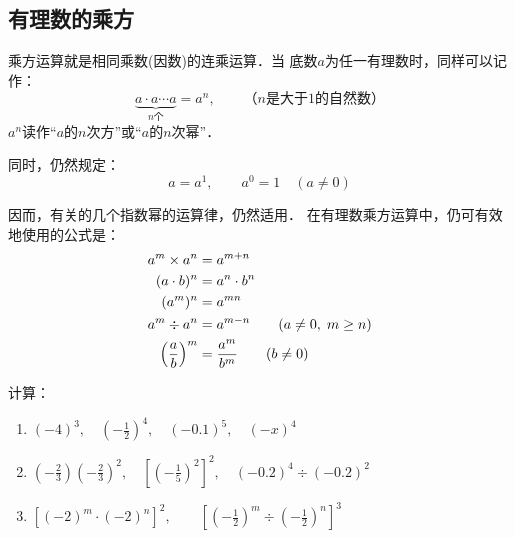 \subsection{有理数的乘方}
  乘方运算就是相同乘数(因数)的连乘运算．当
底数$a$为任一有理数时，同样可以记作：
\[\underbrace{a\cdot a\cdots a}_{n\text{个}} =a^n,\qquad \text{（$n$是大于1的自然数）}  \]
$a^n$读作“$a$的$n$次方”或“$a$的$n$次幂”．

同时，仍然规定：
\[a=a^1,\qquad a^0=1\quad (a\ne 0) \]

因而，有关的几个指数幂的运算律，仍然适用．
在有理数乘方运算中，仍可有效地使用的公式是：
\[\begin{split}
    a^m\times a^n &=a^{m+n}\\
    (a\cdot b)^n&=a^n\cdot b^n\\
    (a^m)^n&=a^{mn}\\
    a^m\div a^n&=a^{m-n}\qquad (a\ne 0,\; m\ge n)\\
\left(\dfrac{a}{b}\right)^m&=\dfrac{a^m}{b^m}\qquad (b\ne 0)
\end{split}\]



\begin{example}
    计算：
\begin{enumerate}
    \item $(-4)^3,\quad \left(-\frac{1}{2}\right)^4,\quad (-0.1)^5,\quad (-x)^4$
    \item $\left(-\frac{2}{3}\right)\left(-\frac{2}{3}\right)^2,\quad \left[\left(-\frac{1}{5}\right)^2\right]^2,\quad (-0.2)^4\div (-0.2)^2$
    \item $\left[(-2)^m\cdot (-2)^n\right]^2,\qquad \left[\left(-\frac{1}{2}\right)^m\div \left(-\frac{1}{2}\right)^n\right]^3$
\end{enumerate}
\end{example}

